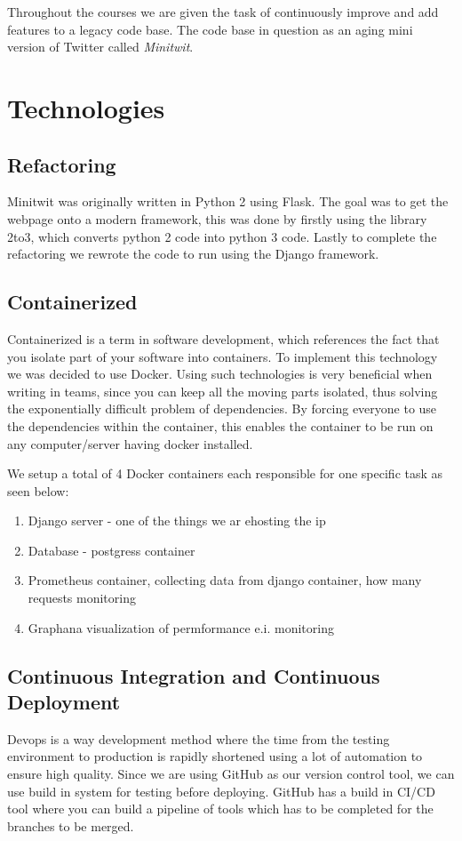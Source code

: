 Throughout the courses we are given the task of continuously improve and add features to a legacy code base. The code base in question as an aging mini version of Twitter called \textit{Minitwit}. 

\section*{Technologies}

\subsection*{Refactoring}

Minitwit was originally written in Python 2 using Flask. The goal was to get the webpage onto a modern framework, this was done by firstly using the library 2to3, which converts python 2 code into python 3 code. Lastly to complete the refactoring we rewrote the code to run using the Django framework.


\subsection*{Containerized}

Containerized is a term in software development, which references the fact that you isolate part of your software into containers. To implement this technology we was decided to use Docker. Using such technologies is very beneficial when writing in teams, since you can keep all the moving parts isolated, thus solving the exponentially difficult problem of dependencies. By forcing everyone to use the dependencies within the container, this enables the container to be run on any computer/server having docker installed.

We setup a total of 4 Docker containers each responsible for one specific task as seen below:


\begin{enumerate}
    \item Django server - one of the things we ar ehosting the ip
    \item Database - postgress container 
    \item Prometheus container, collecting data from django container, how many requests monitoring
    \item Graphana visualization of permformance e.i. monitoring
\end{enumerate}

\subsection*{Continuous Integration and Continuous Deployment}
Devops is a way development method where the time from the testing environment to production is rapidly shortened using a lot of automation to ensure high quality. Since we are using GitHub as our version control tool, we can use build in system for testing before deploying. GitHub has a build in CI/CD tool where you can build a pipeline of tools which has to be completed for the branches to be merged.



